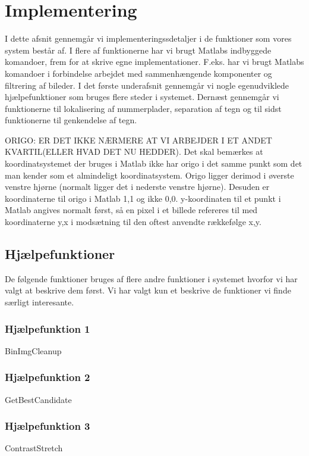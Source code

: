 \section{Implementering}
\label{sec:implementation}

I dette afsnit gennemgår vi implementeringssdetaljer i de funktioner som vores system består af. I flere af funktionerne har vi brugt Matlabs indbyggede komandoer, frem for at skrive egne implementationer. F.eks. har vi brugt Matlabs komandoer i forbindelse arbejdet med sammenhængende komponenter og filtrering af bileder. I det første underafsnit gennemgår vi nogle egenudviklede hjælpefunktioner som bruges flere steder i systemet. Dernæst gennemgår vi funktionerne til lokalisering af nummerplader, separation af tegn og til sidst funktionerne til genkendelse af tegn.

ORIGO: ER DET IKKE NÆRMERE AT VI ARBEJDER I ET ANDET KVARTIL(ELLER HVAD DET NU HEDDER).
Det skal bemærkes at koordinatsystemet der bruges i Matlab ikke har origo i det samme punkt som det man kender som et almindeligt koordinatsystem. Origo ligger derimod i øverste venstre hjørne (normalt ligger det i nederste venstre hjørne). Desuden er koordinaterne til origo i Matlab 1,1 og ikke 0,0. y-koordinaten til et punkt i Matlab angives normalt først, så en pixel i et billede refereres til med koordinaterne y,x i modsætning til den oftest anvendte rækkefølge x,y.


\subsection{Hjælpefunktioner}
De følgende funktioner bruges af flere andre funktioner i systemet hvorfor vi har valgt at beskrive dem først. Vi har valgt kun et beskrive de funktioner vi finde særligt interesante.

\subsubsection{Hjælpefunktion 1}
BinImgCleanup
\subsubsection{Hjælpefunktion 2}
GetBestCandidate
\subsubsection{Hjælpefunktion 3}
ContrastStretch
